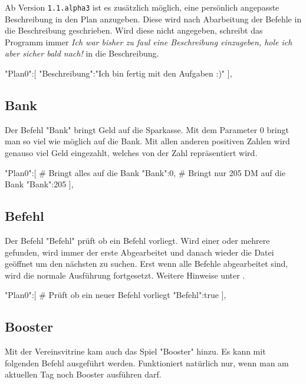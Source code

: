 \documentclass{scrartcl}
\begin{document}
\begin{code}
\end{code}

Ab Version \texttt{1.1.alpha3} ist es zusätzlich möglich, eine persönlich angepasste Beschreibung in den Plan anzugeben. Diese wird nach Abarbeitung der Befehle in die Beschreibung geschrieben. Wird diese nicht angegeben, schreibt das Programm immer \textit{Ich war bisher zu faul eine Beschreibung einzugeben, hole ich aber sicher bald nach!} in die Beschreibung.


\begin{code}[language=bash]
"Plan0":[
	{"Beschreibung":"Ich bin fertig mit den Aufgaben :)"}
],
\end{code} 


\subsection{Bank}
\label{Bank}
Der Befehl "Bank" bringt Geld auf die Sparkasse. Mit dem Parameter 0 bringt man so viel wie möglich auf die Bank. Mit allen anderen positiven Zahlen wird genauso viel Geld eingezahlt, welches von der Zahl repräsentiert wird.

\begin{code}[language=bash]
"Plan0":[
# Bringt alles auf die Bank
	{"Bank":0},
# Bringt nur 205 DM auf die Bank
	{"Bank":205}
],
\end{code}


\subsection{Befehl}
\label{PlanBefehl}
Der Befehl "Befehl" prüft ob ein Befehl vorliegt. Wird einer oder mehrere gefunden, wird immer der erste Abgearbeitet und danach wieder die Datei geöffnet um den nächsten zu suchen. Erst wenn alle Befehle abgearbeitet sind, wird die normale Ausführung fortgesetzt. Weitere Hinweise unter .

\begin{code}[language=bash]
"Plan0":[
# Prüft ob ein neuer Befehl vorliegt
	{"Befehl":true}
],
\end{code}

\subsection{Booster}
\label{Booster}
Mit der Vereinsvitrine kam auch das Spiel "Booster" hinzu. Es kann mit folgenden Befehl ausgeführt werden. Funktioniert natürlich nur, wenn man am aktuellen Tag noch Booster ausführen darf.
\end{document}
